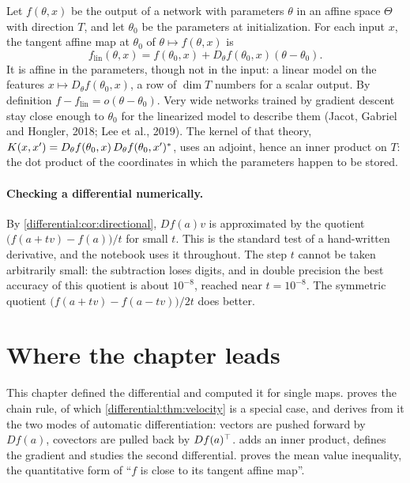 \begin{notechapter}
\begin{mlthread}
Let $f(\theta, x)$ be the output of a network with parameters $\theta$ in
an affine space $\Theta$ with direction $T$, and let $\theta_0$ be the
parameters at initialization. For each input $x$, the tangent affine map
at $\theta_0$ of $\theta\mapsto f(\theta, x)$ is
\[
  f_{\mathrm{lin}}(\theta, x)
  = f(\theta_0, x) + D_\theta f(\theta_0, x)(\theta - \theta_0) .
\]
It is affine in the parameters, though not in the input: a linear model
on the features $x\mapsto D_\theta f(\theta_0, x)$, a row of $\dim T$
numbers for a scalar output. By definition
$f - f_{\mathrm{lin}} = o(\theta - \theta_0)$. Very wide networks trained
by gradient descent stay close enough to $\theta_0$ for the linearized
model to describe them (Jacot, Gabriel and Hongler, 2018; Lee et al.,
2019). The kernel of that theory,
$K(x, x') = D_\theta f(\theta_0, x)\,D_\theta f(\theta_0, x')^{*}$,
uses an adjoint, hence an inner product on $T$: the dot product of the
coordinates in which the parameters happen to be stored.
\end{mlthread}

\paragraph{Checking a differential numerically.} By
\cref{differential:cor:directional}, $Df(a)v$ is approximated by the
quotient $\bigl(f(a + tv) - f(a)\bigr)/t$ for small $t$. This is the
standard test of a hand-written derivative, and the notebook uses it
throughout. The step $t$ cannot be taken arbitrarily small: the
subtraction loses digits, and in double precision the best accuracy of
this quotient is about $10^{-8}$, reached near $t = 10^{-8}$. The
symmetric quotient $\bigl(f(a + tv) - f(a - tv)\bigr)/2t$ does better.

\section{Where the chapter leads}\label{differential:sec:outlook}

This chapter defined the differential and computed it for single maps.
 proves the chain rule, of which
\cref{differential:thm:velocity} is a special case, and derives from it
the two modes of automatic differentiation: vectors are pushed forward by
$Df(a)$, covectors are pulled back by $Df(a)^{\top}$.
 adds an inner product, defines the gradient
and studies the second differential.  proves
the mean value inequality, the quantitative form of ``$f$ is close to its
tangent affine map''.


\end{notechapter}
